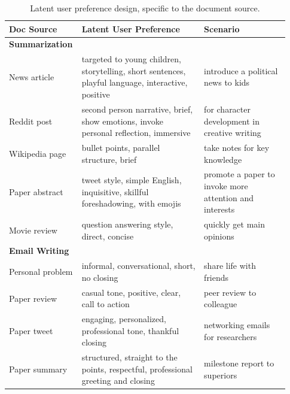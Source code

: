 \begin{table}[t!]
    \centering \small
    \setlength{\tabcolsep}{4.5pt}
    \caption{Latent user preference design, specific to the document source.}   
    \begin{tabular}{p{0.2\linewidth} p{0.43\linewidth} p{0.3\linewidth}}
        \toprule
        \textbf{Doc Source} & \textbf{Latent User Preference} & \textbf{Scenario} \\
        \midrule
        \textbf{Summarization} & &  \\
         News article\newline\citep{see-etal-2017-get} & targeted to young children, storytelling, short sentences, playful language, interactive, positive & introduce a political news to kids \\
         Reddit post\newline\citep{Stiennon2020LearningTS} & second person narrative, brief, show emotions, invoke personal reflection, immersive & for character development in creative writing \\
         Wikipedia page\newline\citep{wikidump} & bullet points, parallel structure, brief & take notes for key knowledge \\
         Paper abstract\newline\citep{clement2019arxiv} & tweet style, simple English, inquisitive, skillful foreshadowing, with emojis & promote a paper to invoke more attention and interests \\
         Movie review\newline\citep{maas-EtAl:2011:ACL-HLT2011} & question answering style, direct, concise & quickly get main opinions \\
        \midrule
         \textbf{Email Writing} & &  \\
         Personal problem\newline\citep{Stiennon2020LearningTS} &  informal, conversational, short, no closing & share life with friends  \\
         Paper review\newline\citep{hua-etal-2019-argument} & casual tone, positive, clear, call to action & peer review to colleague \\
         Paper tweet\newline\citep{Bar_PaperTweet} & engaging, personalized, professional tone, thankful closing & networking emails for researchers \\
         Paper summary\newline\citep{Kershaw2020ElsevierOC} & structured, straight to the points, respectful, professional greeting and closing & milestone report to superiors \\
        \bottomrule
    \end{tabular} 
    \label{tab:latent_user_pref}
\end{table}

